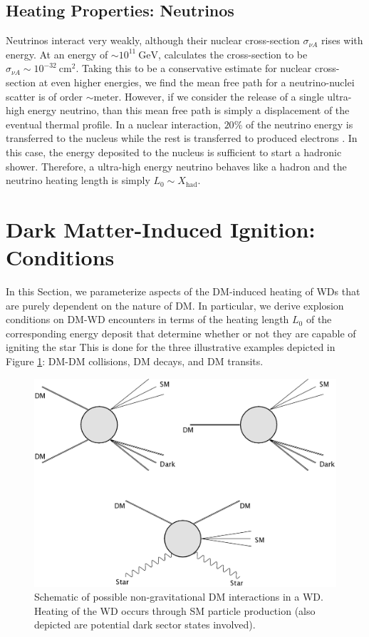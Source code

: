 \documentclass[twocolumn,preprintnumbers,amsmath,amssymb,prl, superscriptaddress]{revtex4}
\newcommand{\GeV}{\text{GeV}}
\newcommand{\cm}{\text{cm}}
\begin{document}
\subsection{Heating Properties: Neutrinos}

Neutrinos interact very weakly, although their nuclear cross-section $\sigma_{\nu A}$ rises with energy.
At an energy of $\sim 10^{11} ~\GeV$, \cite{Formaggio:2013kya} calculates the cross-section to be $\sigma_{\nu A} \sim 10^{-32} ~\cm^2$.
Taking this to be a conservative estimate for nuclear cross-section at even higher energies, we find the mean free path for a neutrino-nuclei scatter is of order $\sim \text{meter}$.
However, if we consider the release of a single ultra-high energy neutrino, than this mean free path is simply a displacement of the eventual thermal profile.
In a nuclear interaction, $20 \%$ of the neutrino energy is transferred to the nucleus while the rest is transferred to produced electrons \cite{Formaggio:2013kya}.
In this case, the energy deposited to the nucleus is sufficient to start a hadronic shower.
Therefore, a ultra-high energy neutrino behaves like a hadron and the neutrino heating length is simply $L_0 \sim X_\text{had}$.

\section{Dark Matter-Induced Ignition: Conditions}
\label{sec:DMexplode}

In this Section, we parameterize aspects of the DM-induced heating of WDs that are purely dependent on the nature of DM.
In particular, we derive explosion conditions on DM-WD encounters in terms of the heating length $L_0$ of the corresponding energy deposit that determine whether or not they are capable of igniting the star
This is done for the three illustrative examples depicted in Figure \ref{fig:feynman}: DM-DM collisions, DM decays, and DM transits.
\begin{figure}
\includegraphics[scale=0.09]{feynmandiag.jpg}
\caption{Schematic of possible non-gravitational DM interactions in a WD. Heating of the WD occurs through SM particle production (also depicted are potential dark sector states involved).}
\label{fig:feynman}
\end{figure}
\end{document}

